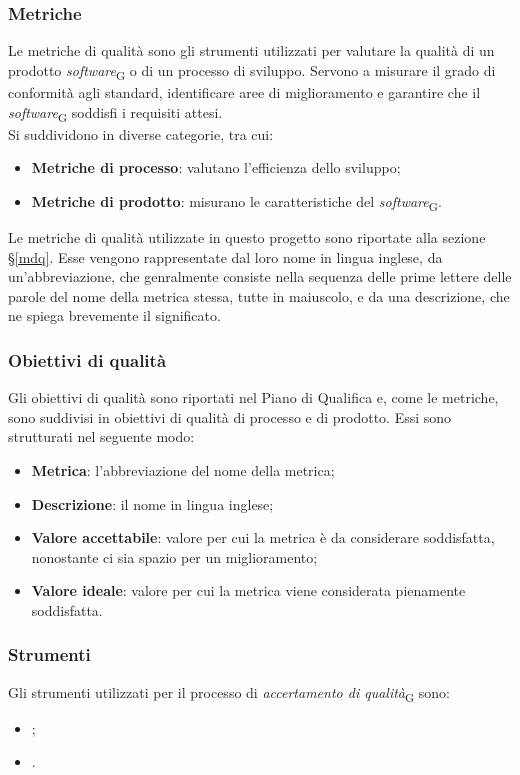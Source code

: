 \subsubsection{Metriche}
Le metriche di qualità sono gli strumenti utilizzati per valutare la qualità di un prodotto \textit{software}\textsubscript{G} o di un processo di sviluppo. Servono a misurare il grado di conformità agli standard, identificare aree di miglioramento e garantire che il \textit{software}\textsubscript{G} soddisfi i requisiti attesi. \\
Si suddividono in diverse categorie, tra cui:
\begin{itemize}
    \item \textbf{Metriche di processo}: valutano l’efficienza dello sviluppo;
    \item \textbf{Metriche di prodotto}: misurano le caratteristiche del \textit{software}\textsubscript{G}.
\end{itemize}
Le metriche di qualità utilizzate in questo progetto sono riportate alla sezione §\ref{mdq}. Esse vengono rappresentate dal loro nome in lingua inglese, da un'abbreviazione, che genralmente consiste nella sequenza delle prime lettere delle parole del nome della metrica stessa, tutte in maiuscolo, e da una descrizione, che ne spiega brevemente il significato.

\subsubsection{Obiettivi di qualità}
Gli obiettivi di qualità sono riportati nel Piano di Qualifica e, come le metriche, sono suddivisi in obiettivi di qualità di processo e di prodotto.
Essi sono strutturati nel seguente modo:
\begin{itemize}
    \item \textbf{Metrica}: l'abbreviazione del nome della metrica;
    \item \textbf{Descrizione}: il nome in lingua inglese;
    \item \textbf{Valore accettabile}: valore per cui la metrica è da considerare soddisfatta, nonostante ci sia spazio per un miglioramento;
    \item \textbf{Valore ideale}: valore per cui la metrica viene considerata pienamente soddisfatta.
\end{itemize}

\subsubsection{Strumenti}
Gli strumenti utilizzati per il processo di \textit{accertamento di qualità}\textsubscript{G} sono:
\begin{itemize}
    \item {};
    \item {}.
\end{itemize}